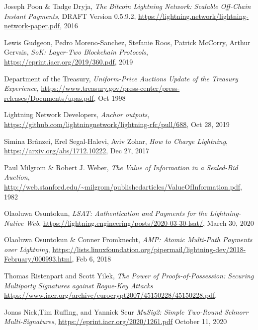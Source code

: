 \documentclass[10pt,a4paper]{article}
\theoremstyle{definition}
\begin{document}


\begin{thebibliography}{9}

    Joseph Poon \& Tadge Dryja,
    \textit{The Bitcoin Lightning Network: Scalable Off-Chain Instant Payments},
    DRAFT Version 0.5.9.2,
    \url{https://lightning.network/lightning-network-paper.pdf},
    2016

    Lewis Gudgeon, Pedro Moreno-Sanchez, Stefanie Roos, Patrick McCorry, Arthur Gervais,
    \textit{SoK: Layer-Two Blockchain Protocols},
    \url{https://eprint.iacr.org/2019/360.pdf},
    2019

    Department of the Treasury,
    \textit{Uniform-Price Auctions Update of the Treasury Experience},
    \url{https://www.treasury.gov/press-center/press-releases/Documents/upas.pdf},
    Oct 1998

    Lightning Network Developers,
    \textit{Anchor outputs},
    \url{https://github.com/lightningnetwork/lightning-rfc/pull/688},
    Oct 28, 2019

    Simina Brânzei, Erel Segal-Halevi, Aviv Zohar,
    \textit{How to Charge Lightning},
    \url{https://arxiv.org/abs/1712.10222},
    Dec 27, 2017

    Paul Milgrom \& Robert J. Weber,
    \textit{The Value of Information in a Sealed-Bid Auction},
    \url{http://web.stanford.edu/~milgrom/publishedarticles/ValueOfInformation.pdf},
    1982

    Olaoluwa Osuntokun,
    \textit{LSAT: Authentication and Payments for the Lightning-Native Web},
    \url{https://lightning.engineering/posts/2020-03-30-lsat/},
    March 30, 2020

    Olaoluwa Osuntokun \& Conner Fromknecht, 
    \textit{AMP: Atomic Multi-Path Payments over Lightning},
    \url{https://lists.linuxfoundation.org/pipermail/lightning-dev/2018-February/000993.html},
    Feb 6, 2018

    Thomas Ristenpart and Scott Yilek,
    \textit{The Power of Proofs-of-Possession: Securing Multiparty Signatures against Rogue-Key Attacks}
    \url{https://www.iacr.org/archive/eurocrypt2007/45150228/45150228.pdf},

    Jonas Nick,Tim Ruffing, and Yannick Seur
    \textit{MuSig2: Simple Two-Round Schnorr Multi-Signatures},
    \url{https://eprint.iacr.org/2020/1261.pdf}
    October 11, 2020


\end{thebibliography}
\end{document}

